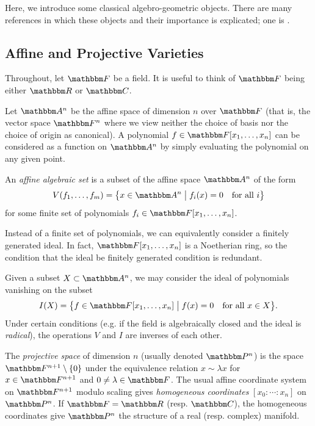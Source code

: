 \documentclass[11pt,titlepage]{article}
\newcommand*{\vbar}{\;\big\vert\;}
\numberwithin{equation}{section}
\begin{document}
    Here, we introduce some classical algebro-geometric objects.  There are many
    references in which these objects and their importance is explicated; one is
    \cite{Sha}.

\subsection{Affine and Projective Varieties}
    \label{sec:varieties}
    Throughout, let $\F$ be a field.  It is useful to think of $\F$ being either
    $\R$ or $\C$.

    Let $\A^n$ be the affine space of dimension $n$ over $\F$ (that is, the
    vector space $\F^n$ where we view neither the choice of basis nor the choice
    of origin as canonical).  A polynomial $f \in \F[x_1, \ldots, x_n]$ can be
    considered as a function on $\A^n$ by simply evaluating the polynomial on
    any given point.

    \begin{definition}
        An \emph{affine algebraic set} is a subset of the affine space $\A^n$
        of the form
        \[
            V(f_1, \ldots, f_m)
            = \cdil[\big]{x \in \A^n \vbar f_i(x) = 0 \quad\text{for all $i$}}
        \]
        for some finite set of polynomials $f_i \in \F[x_1, \ldots, x_n]$.
    \end{definition}
    \noindent Instead of a finite set of polynomials, we can equivalently
    consider a finitely generated ideal.  In fact, $\F[x_1,\ldots,x_n]$ is a
    Noetherian ring, so the condition that the ideal be finitely generated
    condition is redundant.

    Given a subset $X \subset \A^n$, we may consider the ideal of polynomials
    vanishing on the subset
    \[
        I(X) = \cdil[\big]{f \in \F[x_1, \ldots, x_n] \vbar f(x) = 0 \quad\text{for
        all $x \in X$}}.
    \]
    Under certain conditions (e.g. if the field is algebraically closed and the
    ideal is \emph{radical}), the operations $V$ and $I$ are inverses of each other.

    \begin{definition}
        The \emph{projective space} of dimension $n$ (usually denoted $\Proj^n$)
        is the space $\F^{n+1}\setminus \{0\}$ under the equivalence relation $x
        \sim \lambda x$ for $x \in \F^{n+1}$ and $0 \ne \lambda \in \F$.  The
        usual affine coordinate system on $\F^{n+1}$ modulo scaling gives
        \emph{homogeneous coordinates} $[x_0: \cdots: x_n]$ on $\Proj^n$.  If
        $\F = \R$ (resp.  $\C$), the homogeneous coordinates give $\Proj^n$ the
        structure of a real (resp. complex) manifold.
    \end{definition}
\end{document}
